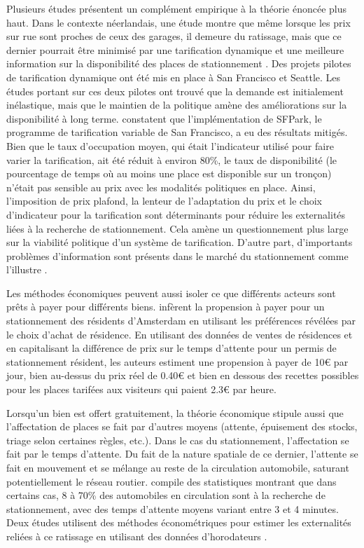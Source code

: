         Plusieurs études présentent un complément empirique à la théorie énoncée plus haut. Dans le contexte néerlandais, une étude montre que même lorsque les prix sur rue sont proches de ceux des garages, il demeure du ratissage, mais que ce dernier pourrait être minimisé par une tarification dynamique et une meilleure information sur la disponibilité  des places de stationnement \parencite{van_ommeren_empirical_2012}. Des projets pilotes de tarification dynamique ont été mis en place à San Francisco et Seattle. Les études portant sur ces deux pilotes ont trouvé que la demande est initialement inélastique, mais que le maintien de la politique amène des améliorations sur la disponibilité à long terme. \textcite{chatman_theory_2014} constatent que l'implémentation de SFPark, le programme de tarification variable de San Francisco, a eu des résultats mitigés. Bien que le taux d'occupation moyen, qui était l'indicateur utilisé pour faire varier la tarification,  ait été réduit à environ 80\%, le taux de disponibilité (le pourcentage de temps où au moins une place est disponible sur un tronçon) n'était pas sensible au prix avec les modalités politiques en place. Ainsi, l'imposition de prix plafond, la lenteur de l'adaptation du prix et le choix d'indicateur pour la tarification sont déterminants pour réduire les externalités liées à la recherche de stationnement. Cela amène un questionnement plus large sur la viabilité politique d'un système de tarification.  D'autre part, d'importants problèmes d'information sont présents dans le marché du stationnement comme l'illustre \textcite{albalate_misinformation_2018}.\par
        Les méthodes économiques peuvent aussi isoler ce que différents acteurs sont prêts à payer pour différents biens. \textcite{van_ommeren_real_2011} infèrent la propension à payer pour un stationnement des résidents d'Amsterdam en utilisant les préférences révélées par le choix d'achat de résidence. En utilisant des données de ventes de résidences et en capitalisant la différence de prix sur le temps d'attente pour un permis de stationnement résident, les auteurs estiment une propension à payer de 10€ par jour, bien au-dessus du prix réel de 0.40€ et bien en dessous des recettes possibles pour les places tarifées aux visiteurs qui paient 2.3€ par heure.\par

        Lorsqu'un bien est offert gratuitement, la théorie économique stipule aussi que l'affectation de places se fait par d'autres moyens (attente, épuisement des stocks, triage selon certaines règles, etc.). Dans le cas du stationnement, l'affectation se fait par le temps d'attente. Du fait de la nature spatiale de ce dernier, l'attente se fait en mouvement et se mélange au reste de la circulation automobile, saturant potentiellement le réseau routier. \textcite[p. 262]{shoup_parking_2018} compile des statistiques montrant que dans certains cas, 8 à 70\% des automobiles en circulation sont à la recherche de stationnement, avec des temps d'attente moyens variant entre 3 et 4 minutes. Deux études utilisent des méthodes économétriques pour estimer les externalités reliées à ce ratissage en utilisant des données d'horodateurs \parencite{van_ommeren_novel_2021,inci_external_2017}.

